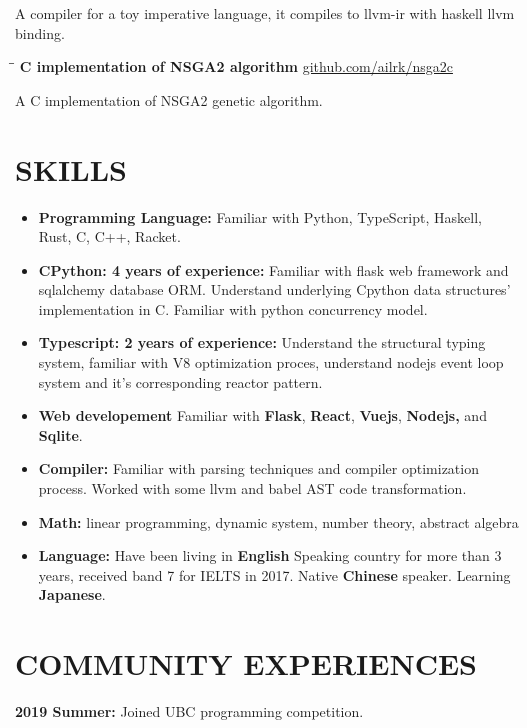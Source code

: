 \documentclass{res}
\begin{document}
\begin{resume}
\begin{tabbing}
    \end{tabbing}\vspace{-30pt}
    A compiler for a toy imperative language, it compiles to llvm-ir with haskell llvm binding.

    \vspace{-0.2in}
    \begin{tabbing}
        \hspace{2.4in}\= \hspace{0.9in}\= \kill
        {\bf C implementation of NSGA2 algorithm} \>               \>\url{github.com/ailrk/nsga2c}\\

    \end{tabbing}\vspace{-30pt}
    A C implementation of NSGA2 genetic algorithm.


\section{SKILLS}
    \begin{itemize}[leftmargin=-.2in]
        \setlength\itemsep{-1em}
        \item \textbf{Programming Language:} Familiar with Python, TypeScript, Haskell, Rust, C, C++, Racket.\\
        \item \textbf{CPython: 4 years of experience:} Familiar with flask web framework and sqlalchemy database ORM. Understand underlying Cpython data structures' implementation in C. Familiar with python concurrency model. \\
        \item \textbf{Typescript: 2 years of experience:} Understand the structural typing system, familiar with V8 optimization proces, understand nodejs event loop system and it's corresponding reactor pattern. \\
        \item \textbf{Web developement} Familiar with \textbf{Flask}, \textbf{React}, \textbf{Vuejs}, \textbf{ Nodejs,} and \textbf{Sqlite}. \\
        \item \textbf{Compiler:} Familiar with parsing techniques and compiler optimization process. Worked with some llvm and babel AST code transformation. \\
        \item \textbf{Math:} linear programming, dynamic system, number theory, abstract algebra \\
        \item \textbf{Language:} Have been living in \textbf{English} Speaking country for more than 3 years, received band 7 for IELTS in 2017. Native \textbf{Chinese} speaker. Learning \textbf{Japanese}.
    \end{itemize}

\section{COMMUNITY EXPERIENCES}
    \textbf {2019 Summer:} Joined UBC programming competition.
\end{resume}
\end{document}

